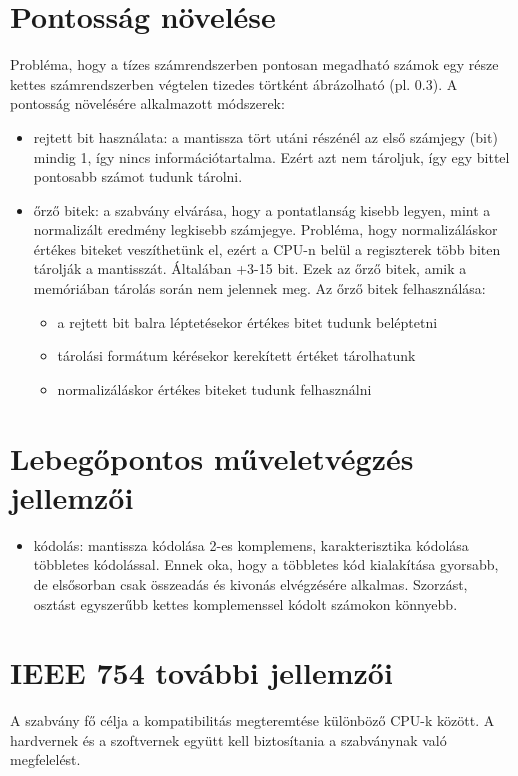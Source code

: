 \section{Pontosság növelése}
Probléma, hogy a tízes számrendszerben pontosan megadható számok egy része kettes számrendszerben végtelen tizedes törtként ábrázolható (pl. 0.3).
A pontosság növelésére alkalmazott módszerek:
\begin{itemize}
    \item rejtett bit használata: a mantissza tört utáni részénél az első számjegy (bit) mindig 1, így nincs információtartalma. Ezért azt nem tároljuk, így egy bittel pontosabb számot tudunk tárolni.
    \item őrző bitek: a szabvány elvárása, hogy a pontatlanság kisebb legyen, mint a normalizált eredmény legkisebb számjegye. Probléma, hogy normalizáláskor értékes biteket veszíthetünk el, ezért a CPU-n belül a regiszterek több biten tárolják a mantisszát. Általában +3-15 bit. Ezek az őrző bitek, amik a memóriában tárolás során nem jelennek meg. Az őrző bitek felhasználása:
    \begin{itemize}
        \item a rejtett bit balra léptetésekor értékes bitet tudunk beléptetni
        \item tárolási formátum kérésekor kerekített értéket tárolhatunk
        \item normalizáláskor értékes biteket tudunk felhasználni
    \end{itemize}
\end{itemize}

\section{Lebegőpontos műveletvégzés jellemzői}
\begin{itemize}
    \item kódolás: mantissza kódolása 2-es komplemens, karakterisztika kódolása többletes kódolással. Ennek oka, hogy a többletes kód kialakítása gyorsabb, de elsősorban csak összeadás és kivonás elvégzésére alkalmas. Szorzást, osztást egyszerűbb kettes komplemenssel kódolt számokon könnyebb.
\end{itemize}

\section{IEEE 754 további jellemzői}
A szabvány fő célja a kompatibilitás megteremtése különböző CPU-k között.
A hardvernek és a szoftvernek együtt kell biztosítania a szabványnak való megfelelést.

